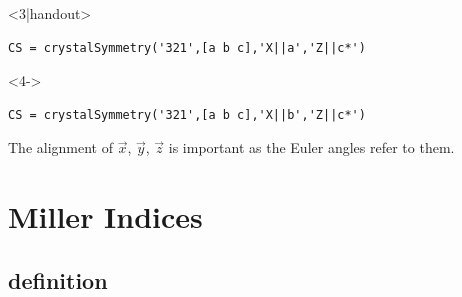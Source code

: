 \documentclass[compress]{beamer}
\begin{document}
\begin{frame}[fragile]
\begin{overlayarea}{\textwidth}{8cm}
\begin{columns}
\begin{column}{4.5cm}
\end{column}
\end{columns}

\begin{onlyenv}<3|handout>
  \begin{lstlisting}[style=input]
CS = crystalSymmetry('321',[a b c],'X||a','Z||c*')
  \end{lstlisting}
\end{onlyenv}

\begin{onlyenv}<4->
  \begin{lstlisting}[style=input]
CS = crystalSymmetry('321',[a b c],'X||b','Z||c*')
\end{lstlisting}
The alignment of $\vec x$, $\vec y$, $\vec z$ is important as the Euler angles
refer to them.
\end{onlyenv}

\end{overlayarea}

\end{frame}

\section{Miller Indices}
\label{sec:miller-indices}

\subsection*{definition}
\label{sec:definition}
\end{document}
